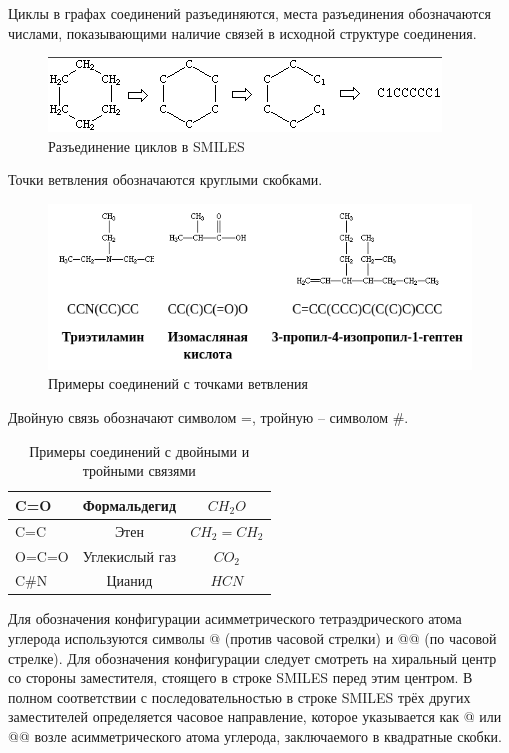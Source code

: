 \documentclass[a4paper,14pt]{extreport}
\begin{document}
Циклы в графах соединений разъединяются, места разъединения обозначаются числами, показывающими наличие связей в исходной структуре соединения.

\begin{figure}[htp]
\centering
\includegraphics[scale=1.20]{images/Screenshot from 2021-12-04 16-34-09.png}
\caption{Разъединение циклов в SMILES}
\label{cycles}
\end{figure}

Точки ветвления обозначаются круглыми скобками.

\begin{figure}[htp]
\centering
\includegraphics[scale=0.80]{images/Screenshot from 2021-12-04 16-45-58.png}
\caption{Примеры соединений с точками ветвления}
\label{branches}
\end{figure}

Двойную связь обозначают символом =, тройную – символом \#.

\begin{table}[H]
\caption{Примеры соединений с двойными и тройными связями}
\begin{center}
\begin{tabular}{|l|c|c|}
\hline
	C=O & Формальдегид & $CH_2O$\\
\hline
	C=C & Этен & $CH_2=CH_2$\\
\hline
	O=C=O & Углекислый газ & $CO_2$\\
\hline
	C\#N & Цианид & $HCN$\\
\hline
\end{tabular}
\end{center}
\end{table}

Для обозначения конфигурации асимметрического тетраэдрического атома углерода используются символы @ (против часовой стрелки) и @@ (по часовой стрелке). Для обозначения конфигурации следует смотреть на хиральный центр со стороны заместителя, стоящего в строке SMILES перед этим центром. В полном соответствии с последовательностью в строке SMILES трёх других заместителей определяется часовое направление, которое указывается как @ или @@ возле асимметрического атома углерода, заключаемого в квадратные скобки.
\end{document}
